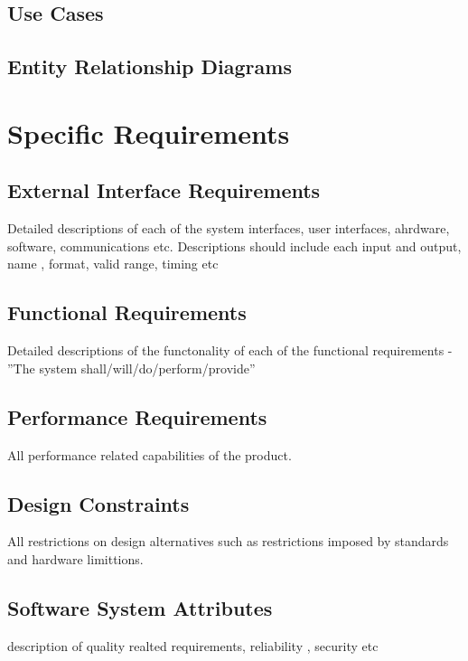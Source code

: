 \documentclass{article}
\begin{document}
\subsection{Use Cases}

\subsection{Entity Relationship Diagrams}

\newpage
\section{Specific Requirements}

	\subsection{External Interface Requirements}
		Detailed descriptions of each of the system interfaces, user interfaces, ahrdware, software, communications etc.
		Descriptions should include each input and output, name , format, valid range, timing etc
	
	\subsection{Functional Requirements}
		Detailed descriptions of the functonality of each of the functional requirements - ''The system shall/will/do/perform/provide''
		
	\subsection{Performance Requirements}
		All performance related capabilities of the product.
	
	
	\subsection{Design Constraints}
		All restrictions on design alternatives such as restrictions imposed by standards and hardware limittions.
	
	\subsection{Software System Attributes}
		description of quality realted requirements, reliability , security etc
\end{document}
